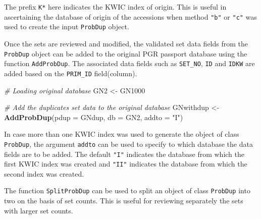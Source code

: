 \documentclass[
]{article}
\newenvironment{Shaded}{\begin{snugshade}}{\end{snugshade}}
\newcommand{\CommentTok}[1]{\textcolor[rgb]{0.56,0.35,0.01}{\textit{#1}}}
\newcommand{\DataTypeTok}[1]{\textcolor[rgb]{0.13,0.29,0.53}{#1}}
\newcommand{\KeywordTok}[1]{\textcolor[rgb]{0.13,0.29,0.53}{\textbf{#1}}}
\newcommand{\NormalTok}[1]{#1}
\newcommand{\StringTok}[1]{\textcolor[rgb]{0.31,0.60,0.02}{#1}}
\begin{document}
The prefix \texttt{K*} here indicates the KWIC index of origin. This is
useful in ascertaining the database of origin of the accessions when
method \texttt{"b"} or \texttt{"c"} was used to create the input
\texttt{ProbDup} object.

Once the sets are reviewed and modified, the validated set data fields
from the \texttt{ProbDup} object can be added to the original PGR
passport database using the function \texttt{AddProbDup}. The associated
data fields such as \texttt{SET\_NO}, \texttt{ID} and \texttt{IDKW} are
added based on the \texttt{PRIM\_ID} field(column).

\begin{Shaded}
\begin{Highlighting}[]
\CommentTok{# Loading original database}
\NormalTok{GN2 <-}\StringTok{ }\NormalTok{GN1000}

\CommentTok{# Add the duplicates set data to the original database}
\NormalTok{GNwithdup <-}\StringTok{  }\KeywordTok{AddProbDup}\NormalTok{(}\DataTypeTok{pdup =}\NormalTok{ GNdup, }\DataTypeTok{db =}\NormalTok{ GN2, }\DataTypeTok{addto =} \StringTok{"I"}\NormalTok{)}
\end{Highlighting}
\end{Shaded}

In case more than one KWIC index was used to generate the object of
class \texttt{ProbDup}, the argument \texttt{addto} can be used to
specify to which database the data fields are to be added. The default
\texttt{"I"} indicates the database from which the first KWIC index was
created and \texttt{"II"} indicates the database from which the second
index was created.

The function \texttt{SplitProbDup} can be used to split an object of
class \texttt{ProbDup} into two on the basis of set counts. This is
useful for reviewing separately the sets with larger set counts.
\end{document}
